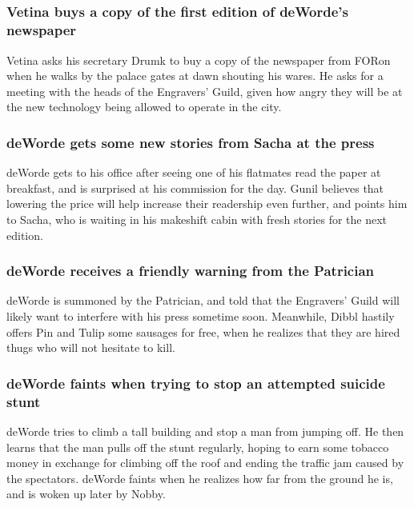\subsection{}
\subsubsection{\Gls{Vetina} buys a copy of the first edition of \Gls{deWorde}'s newspaper}
\Gls{Vetina} asks his secretary \Gls{Drumk} to buy a copy of the newspaper from \Gls{FORon} when he
walks by the palace gates at dawn shouting his wares. He asks for a meeting with the heads of the
Engravers' Guild, given how angry they will be at the new technology being allowed to operate in the
city.

\subsubsection{\Gls{deWorde} gets some new stories from \Gls{Sacha} at the press}
\Gls{deWorde} gets to his office after seeing one of his flatmates read the paper at breakfast, and
is surprised at his commission for the day. \Gls{Gunil} believes that lowering the price will help
increase their readership even further, and points him to \Gls{Sacha}, who is waiting in his
makeshift cabin with fresh stories for the next edition.

\subsubsection{\Gls{deWorde} receives a friendly warning from the Patrician}
\Gls{deWorde} is summoned by the Patrician, and told that the Engravers' Guild will likely want to
interfere with his press sometime soon. Meanwhile, \Gls{Dibbl} hastily offers \Gls{Pin} and
\Gls{Tulip} some sausages for free, when he realizes that they are hired thugs who will not hesitate
to kill.

\subsubsection{\Gls{deWorde} faints when trying to stop an attempted suicide stunt}
\Gls{deWorde} tries to climb a tall building and stop a man from jumping off. He then learns that
the man pulls off the stunt regularly, hoping to earn some tobacco money in exchange for climbing
off the roof and ending the traffic jam caused by the spectators. \Gls{deWorde} faints when he
realizes how far from the ground he is, and is woken up later by \Gls{Nobby}.

